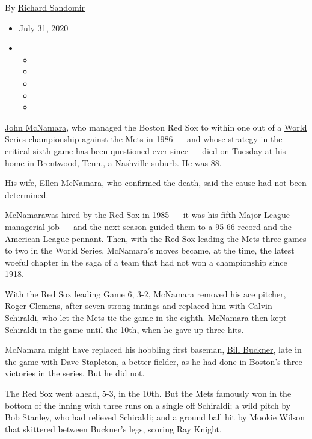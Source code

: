 By \href{https://www.nytimes3xbfgragh.onion/by/richard-sandomir}{Richard
Sandomir}

\begin{itemize}
\item
  July 31, 2020
\item
  \begin{itemize}
  \item
  \item
  \item
  \item
  \item
  \end{itemize}
\end{itemize}

\href{https://www.baseball-reference.com/managers/mcnamjo99.shtml}{John
McNamara}, who managed the Boston Red Sox to within one out of a
\href{https://www.baseball-reference.com/postseason/1986_WS.shtml}{World
Series championship against the Mets in 1986} --- and whose strategy in
the critical sixth game has been questioned ever since --- died on
Tuesday at his home in Brentwood, Tenn., a Nashville suburb. He was 88.

His wife, Ellen McNamara, who confirmed the death, said the cause had
not been determined.

\href{https://sabr.org/bioproj/person/john-mcnamara/}{McNamara}was hired
by the Red Sox in 1985 --- it was his fifth Major League managerial job
--- and the next season guided them to a 95-66 record and the American
League pennant. Then, with the Red Sox leading the Mets three games to
two in the World Series, McNamara's moves became, at the time, the
latest woeful chapter in the saga of a team that had not won a
championship since 1918.

With the Red Sox leading Game 6, 3-2, McNamara removed his ace pitcher,
Roger Clemens, after seven strong innings and replaced him with Calvin
Schiraldi, who let the Mets tie the game in the eighth. McNamara then
kept Schiraldi in the game until the 10th, when he gave up three hits.

McNamara might have replaced his hobbling first baseman,
\href{https://www.nytimes3xbfgragh.onion/2019/05/27/obituaries/bill-buckner-all-star-shadowed-by-world-series-error-dies-at-69.html}{Bill
Buckner}, late in the game with Dave Stapleton, a better fielder, as he
had done in Boston's three victories in the series. But he did not.

The Red Sox went ahead, 5-3, in the 10th. But the Mets famously won in
the bottom of the inning with three runs on a single off Schiraldi; a
wild pitch by Bob Stanley, who had relieved Schiraldi; and a ground ball
hit by Mookie Wilson that skittered between Buckner's legs, scoring Ray
Knight.

